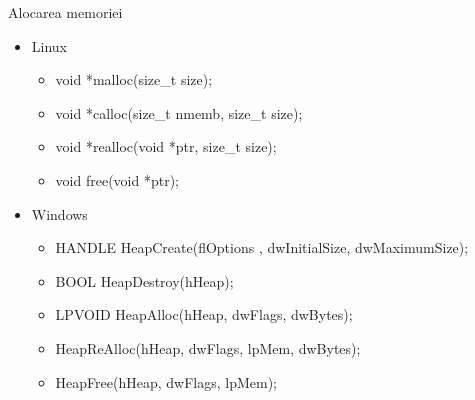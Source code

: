 \documentclass{so.cs.pub.ro}
\begin{document}
\begin{frame}{Alocarea memoriei}
  \begin{itemize}
    \item Linux 
    \begin{itemize}
		\item void *malloc(size_t size);
		\item void *calloc(size_t nmemb, size_t size);
		\item void *realloc(void *ptr, size_t size);
		\item void free(void *ptr);    
    \end{itemize}
    \vspace*{0.2cm}
    \item Windows
    \begin{itemize}
		\item HANDLE HeapCreate(flOptions , dwInitialSize, dwMaximumSize);
		\item BOOL HeapDestroy(hHeap);
		\item LPVOID HeapAlloc(hHeap, dwFlags, dwBytes);
		\item HeapReAlloc(hHeap, dwFlags, lpMem, dwBytes);
		\item HeapFree(hHeap, dwFlags, lpMem);   
    \end{itemize}
  \end{itemize}
\end{frame}
\end{document}
